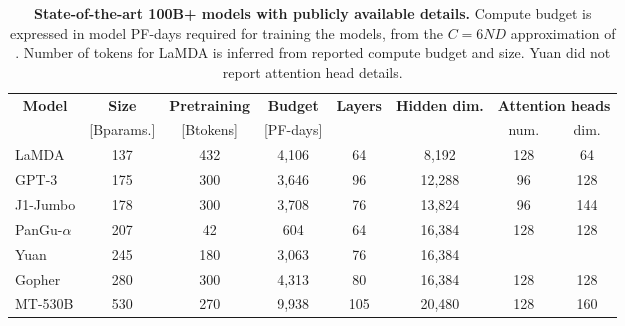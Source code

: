 \begin{table*}[t]
\begin{small}
\begin{center}
\begin{tabular}{@{}lccccccc@{}}
\toprule
\multicolumn{1}{c}{\textbf{Model}} & \textbf{Size} & \textbf{Pretraining} & \textbf{Budget} & \textbf{Layers} & \textbf{Hidden dim.} & \multicolumn{2}{c}{\textbf{Attention heads}} \\ 
               & {[Bparams.]} & {[Btokens]}         & {[PF-days]}   &                 &                      & num.                  & dim.                 \\ \midrule
LaMDA \cite{thoppilan2022lamda}          & 137           & 432                  & 4,106            & 64              & 8,192                & 128                   & 64                   \\
GPT-3 \cite{brown2020gpt3}         & 175           & 300                  & 3,646            & 96              & 12,288               & 96                    & 128                  \\
J1-Jumbo \cite{J1WhitePaper}       & 178           & 300                  & 3,708            & 76              & 13,824               & 96                    & 144                  \\
PanGu-$\alpha$ \cite{zeng2021pangu} & 207           & 42                   & 604              & 64              & 16,384               & 128                   & 128                  \\
Yuan \cite{wu2021yuan}           & 245           & 180                  & 3,063            & 76              & 16,384               &  & \\
Gopher \cite{rae2021scaling}         & 280           & 300                  & 4,313            & 80              & 16,384               & 128                   & 128                  \\
MT-530B \cite{smith2022using}       & 530           & 270                  & 9,938            & 105             & 20,480               & 128                   & 160                  \\ \bottomrule
\end{tabular}
\end{center}
\end{small}
\caption{\textbf{State-of-the-art 100B+ models with publicly available details.} Compute budget is expressed in model PF-days required for training the models, from the $C= 6ND$ approximation of \citet{kaplan2020scaling}. Number of tokens for LaMDA is inferred from reported compute budget and size. Yuan did not report attention head details.}
\label{tab:sota_models}
\end{table*}

